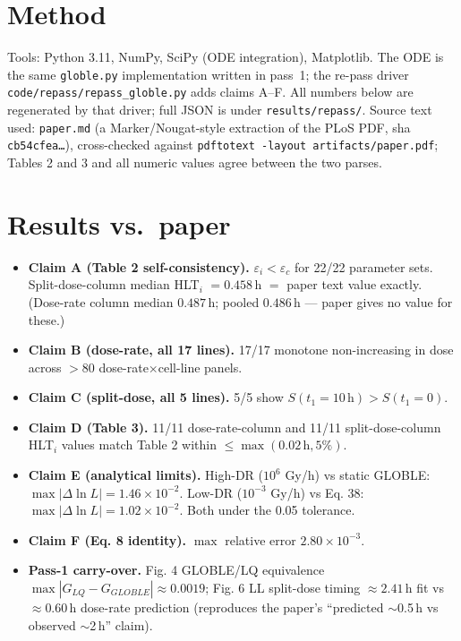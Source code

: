 \documentclass[11pt]{article}
\begin{document}
\section{Method}
Tools: Python 3.11, NumPy, SciPy (ODE integration), Matplotlib. The ODE is the
same \texttt{globle.py} implementation written in pass~1; the re-pass driver
\texttt{code/repass/repass\_globle.py} adds claims A--F. All numbers below are
regenerated by that driver; full JSON is under \texttt{results/repass/}. Source
text used: \texttt{paper.md} (a Marker/Nougat-style extraction of the PLoS PDF,
sha \texttt{cb54cfea\dots}), cross-checked against
\texttt{pdftotext -layout artifacts/paper.pdf}; Tables 2 and 3 and all numeric
values agree between the two parses.

\section{Results vs.\ paper}
\begin{itemize}
\item \textbf{Claim A (Table 2 self-consistency).} $\varepsilon_i < \varepsilon_c$
for 22/22 parameter sets. Split-dose-column median HLT$_i$ $=0.458$\,h $=$ paper
text value exactly. (Dose-rate column median $0.487$\,h; pooled $0.486$\,h ---
paper gives no value for these.)
\item \textbf{Claim B (dose-rate, all 17 lines).} 17/17 monotone non-increasing
in dose across $>$80 dose-rate$\times$cell-line panels.
\item \textbf{Claim C (split-dose, all 5 lines).} 5/5 show $S(t_1{=}10\,\text{h}) > S(t_1{=}0)$.
\item \textbf{Claim D (Table 3).} 11/11 dose-rate-column and 11/11
split-dose-column HLT$_i$ values match Table 2 within $\le\max(0.02\,\text{h}, 5\%)$.
\item \textbf{Claim E (analytical limits).} High-DR ($10^6$ Gy/h) vs static GLOBLE:
$\max|\Delta\ln L| = 1.46\times10^{-2}$. Low-DR ($10^{-3}$ Gy/h) vs Eq. 38:
$\max|\Delta\ln L| = 1.02\times10^{-2}$. Both under the 0.05 tolerance.
\item \textbf{Claim F (Eq. 8 identity).} $\max$ relative error $2.80\times10^{-3}$.
\item \textbf{Pass-1 carry-over.} Fig. 4 GLOBLE/LQ equivalence
$\max|G_{LQ}-G_{GLOBLE}|\approx0.0019$; Fig. 6 LL split-dose timing $\approx2.41$\,h
fit vs $\approx0.60$\,h dose-rate prediction (reproduces the paper's
``predicted $\sim$0.5\,h vs observed $\sim$2\,h'' claim).
\end{itemize}
\end{document}
